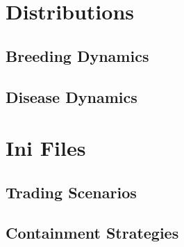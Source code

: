 \appendix
\chapter{Distributions}
\section{Breeding Dynamics}
\section{Disease Dynamics}

\chapter{Ini Files}
\section{Trading Scenarios}
\section{Containment Strategies}\label{chap:iniContainment}
